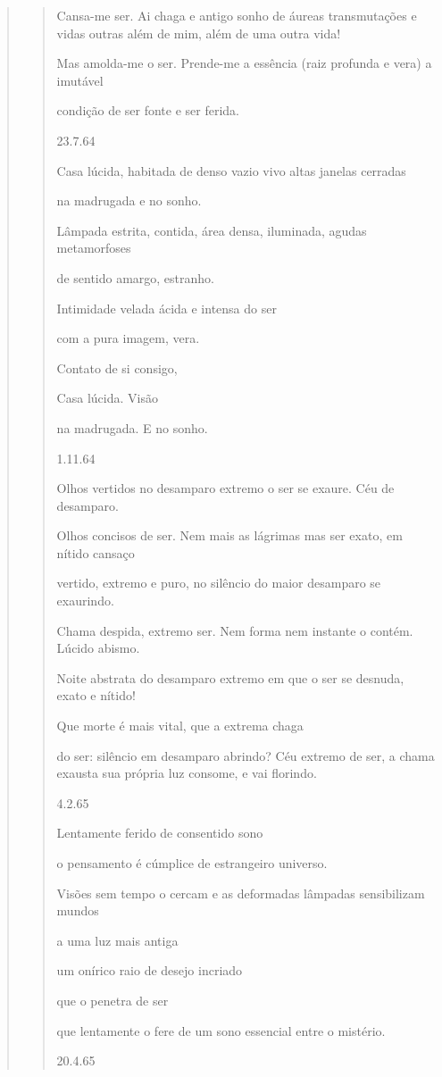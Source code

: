 \begin{verse}
\begin{quote}
Cansa-me ser. Ai chaga e antigo sonho de áureas transmutações e vidas
outras além de mim, além de uma outra vida!

Mas amolda-me o ser. Prende-me a essência (raiz profunda e vera) a
imutável

condição de ser fonte e ser ferida.

23.7.64

Casa lúcida, habitada de denso vazio vivo altas janelas cerradas

na madrugada e no sonho.

Lâmpada estrita, contida, área densa, iluminada, agudas metamorfoses

de sentido amargo, estranho.

Intimidade velada ácida e intensa do ser

com a pura imagem, vera.

Contato de si consigo,

Casa lúcida. Visão

na madrugada. E no sonho.

1.11.64

Olhos vertidos no desamparo extremo o ser se exaure. Céu de desamparo.

Olhos concisos de ser. Nem mais as lágrimas mas ser exato, em nítido
cansaço

vertido, extremo e puro, no silêncio do maior desamparo se exaurindo.

Chama despida, extremo ser. Nem forma nem instante o contém. Lúcido
abismo.

Noite abstrata do desamparo extremo em que o ser se desnuda, exato e
nítido!

Que morte é mais vital, que a extrema chaga

do ser: silêncio em desamparo abrindo? Céu extremo de ser, a chama
exausta sua própria luz consome, e vai florindo.

4.2.65

Lentamente ferido de consentido sono

o pensamento é cúmplice de estrangeiro universo.

Visões sem tempo o cercam e as deformadas lâmpadas sensibilizam mundos

a uma luz mais antiga

um onírico raio de desejo incriado

que o penetra de ser

que lentamente o fere de um sono essencial entre o mistério.

20.4.65


\end{quote}
\end{verse}
